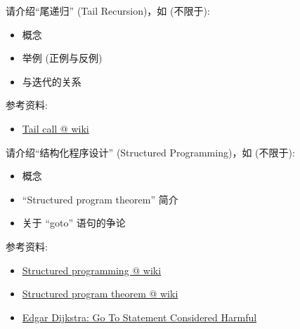 \documentclass[a4paper, justified]{tufte-handout}
\begin{document}
\beginoptional

\begin{problem}[]
\end{problem}

\begin{solution}
\end{solution}

\beginot

\begin{ot}[尾递归]
  请介绍``尾递归'' (Tail Recursion)，如 (不限于):
  \begin{itemize}
    \item 概念
    \item 举例 (正例与反例)
    \item 与迭代的关系
  \end{itemize}

  \noindent 参考资料:
  \begin{itemize}
    \item \href{https://en.wikipedia.org/wiki/Tail\_call}{Tail call @ wiki}
  \end{itemize}
\end{ot}

\vspace{0.50cm}
\begin{ot}[结构化程序设计]
  请介绍``结构化程序设计'' (Structured Programming)，如 (不限于):
  \begin{itemize}
    \item 概念
    \item ``Structured program theorem'' 简介
    \item 关于 ``goto'' 语句的争论
  \end{itemize}

  \noindent 参考资料:
  \begin{itemize}
    \item \href{https://en.wikipedia.org/wiki/Structured\_programming}{Structured programming @ wiki}
    \item \href{https://en.wikipedia.org/wiki/Structured\_program\_theorem}{Structured program theorem @ wiki}
    \item \href{https://homepages.cwi.nl/~storm/teaching/reader/Dijkstra68.pdf}{Edgar Dijkstra: Go To Statement Considered Harmful}
  \end{itemize}
\end{ot}
\end{document}
